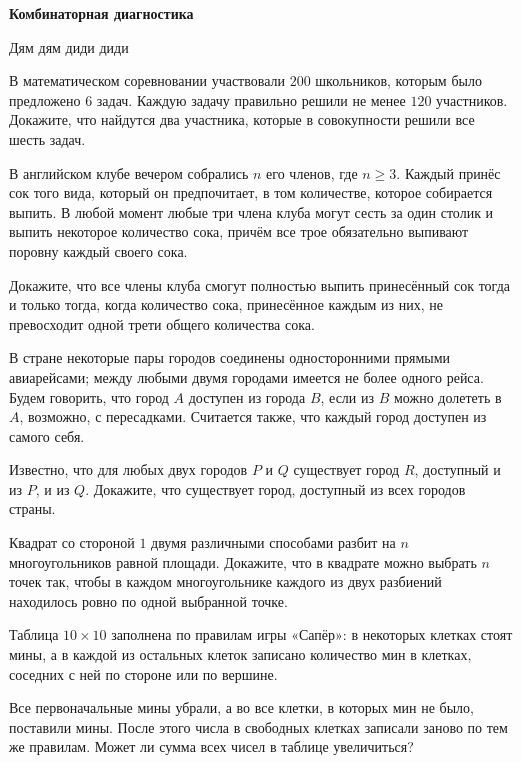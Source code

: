 \centerline{\bf \Huge Комбинаторная диагностика}

\begin{flushright}
        \scriptsize{Дям дям диди диди}
\end{flushright}

В математическом соревновании участвовали $200$ школьников, которым было предложено $6$ задач. Каждую задачу правильно решили не менее $120$ участников. Докажите, что найдутся два участника, которые в совокупности решили все шесть задач.

В английском клубе вечером собрались $n$ его членов, где $n\geqslant 3$. Каждый принёс сок того вида, который он предпочитает, в том количестве, которое собирается выпить. В любой момент любые три члена клуба могут сесть за один столик и выпить некоторое количество сока, причём все трое обязательно выпивают поровну каждый своего сока.

Докажите, что все члены клуба смогут полностью выпить принесённый сок тогда и только тогда, когда количество сока, принесённое каждым из них, не превосходит одной трети общего количества сока.

В стране некоторые пары городов соединены односторонними прямыми авиарейсами; между любыми двумя городами имеется не более одного рейса. Будем говорить, что город $A$ доступен из города $B$, если из $B$ можно долететь в $A$, возможно, с пересадками. Считается также, что каждый город доступен из самого себя.

Известно, что для любых двух городов $P$ и $Q$ существует город $R$, доступный и из $P$, и из $Q$. Докажите, что существует город, доступный из всех городов страны.

Квадрат со стороной $1$ двумя различными способами разбит на $n$ многоугольников равной площади. Докажите, что в квадрате можно выбрать $n$ точек так, чтобы в каждом многоугольнике каждого из двух разбиений находилось ровно по одной выбранной точке.

Таблица $10\times 10$ заполнена по правилам игры «Сапёр»: в некоторых клетках стоят мины, а в каждой из остальных клеток записано количество мин в клетках, соседних с ней по стороне или по вершине.

Все первоначальные мины убрали, а во все клетки, в которых мин не было, поставили мины. После этого числа в свободных клетках записали заново по тем же правилам. Может ли сумма всех чисел в таблице увеличиться?
